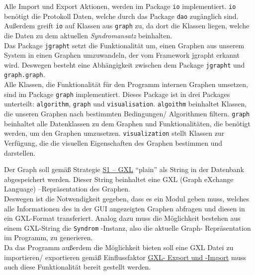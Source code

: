 \documentclass[enabledeprecatedfontcommands,fontsize=11pt,paper=a4,twoside]{scrartcl}
\newcounter{one}
\begin{document}
Alle Import und Export Aktionen, werden im Package \texttt{io} implementiert. \texttt{io} benötigt die Protokoll Daten, welche durch das Package \texttt{dao} zugänglich sind. Außerdem greift \texttt{io} auf Klassen aus \texttt{graph} zu, da dort die Klassen liegen, welche die Daten zu dem aktuellen \textit{Syndromansatz} beinhalten. \\

Das Package \texttt{jgrapht} setzt die Funktionalität um, einen Graphen aus unserem System in einen Graphen umzuwandeln, der vom Framework jgrapht erkannt wird. Deswegen besteht eine Abhängigkeit zwischen dem Package \texttt{jgrapht} und \texttt{graph.graph}. \\

Alle Klassen, die Funktionalität für den Programm internen Graphen umsetzen, sind im Package \texttt{graph} implementiert.  Dieses Package ist in drei Packages unterteilt: \texttt{algorithm}, \texttt{graph} und \texttt{visualisation}. \texttt{algoithm} beinhaltet Klassen, die unseren Graphen nach bestimmten Bedingungen/ Algorithmen filtern. \texttt{graph} beinhaltet alle Datenklassen zu dem Graphen und Funktionalitäten, die benötigt werden, um den Graphen umzusetzen. \texttt{visualization} stellt Klassen zur Verfügung, die die visuellen Eigenschaften des Graphen bestimmen und darstellen. 




Der Graph soll gemäß Strategie \hyperlink{yy}{S1 – GXL} "`plain"' als String in der Datenbank abgespeichert werden. Dieser String beinhaltet eine GXL (Graph eXchange Language) –Repräsentation des Graphen.\\
Deswegen ist die Notwendigkeit gegeben, dass es ein Modul geben muss, welches alle Informationen des in der GUI angezeigten Graphen abfragen und diesen in ein GXL-Format transferiert. Analog dazu muss die Möglichkeit bestehen aus einem GXL-String die \texttt{Syndrom} -Instanz, also die aktuelle Graph- Repräsentation im Programm,  zu generieren. \\
Da das Programm außerdem die Möglichkeit bieten soll eine GXL Datei zu importieren/ exportieren gemäß Einflussfaktor \hyperlink{ii}{GXL- Export und -Import} muss auch diese Funktionalität bereit gestellt werden.\\ \\ 
\end{document}
